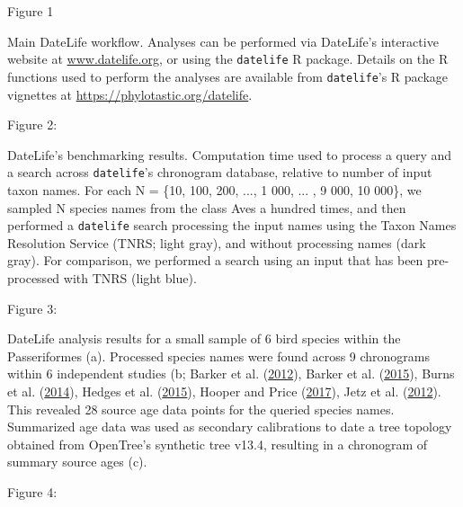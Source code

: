 
Figure 1

Main DateLife workflow. Analyses can be performed via DateLife's interactive website at \url{www.datelife.org}, or using the \texttt{datelife} R package. Details on the R functions used to perform the analyses are available from \texttt{datelife}'s R package vignettes at \url{https://phylotastic.org/datelife}.

Figure 2:

DateLife's benchmarking results. Computation time used to process a query and a search across \texttt{datelife}'s chronogram database, relative to number of input taxon names. For each N = \{10, 100, 200, ..., 1 000, ... , 9 000, 10 000\}, we sampled N species names from the class Aves a hundred times, and then performed a \texttt{datelife} search processing the input names using the Taxon Names Resolution Service (TNRS; light gray), and without processing names (dark gray). For comparison, we performed a search using an input that has been pre-processed with TNRS (light blue).

Figure 3:

DateLife analysis results for a small sample of 6 bird species within the Passeriformes (a). Processed species names were found across 9 chronograms within 6 independent studies (b; Barker et al. (\protect\hyperlink{ref-barker2012going}{2012}), Barker et al. (\protect\hyperlink{ref-barker2015new}{2015}), Burns et al. (\protect\hyperlink{ref-burns2014phylogenetics}{2014}), Hedges et al. (\protect\hyperlink{ref-Hedges2015}{2015}), Hooper and Price (\protect\hyperlink{ref-hooper2017chromosomal}{2017}), Jetz et al. (\protect\hyperlink{ref-Jetz2012}{2012}). This revealed 28 source age data points for the queried species names. Summarized age data was used as secondary calibrations to date a tree topology obtained from OpenTree's synthetic tree v13.4, resulting in a chronogram of summary source ages (c).


Figure 4:

